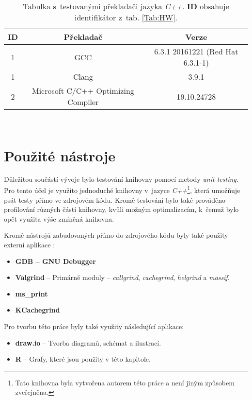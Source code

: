 \begin{table}[H]
	\begin{center}
		\begin{tabular}{| c | c | c |}
			\hline
			\textbf{ID} & \textbf{Překladač} & \textbf{Verze} \\
			\hline
			1 & GCC & 6.3.1 20161221 (Red Hat 6.3.1-1) \\
			\hline
			1 & Clang & 3.9.1 \\
			\hline
			2 & Microsoft C/C++ Optimizing Compiler & 19.10.24728 \\
			\hline
		\end{tabular}\\[1em]
		\caption{Tabulka s~testovanými překladači jazyka \emph{C++}. \textbf{ID} obsahuje identifikátor z~tab. \ref{Tab:HW}.}
		\label{Tab:Compiler}
	\end{center}
\end{table}

\section{Použité nástroje}

Důležitou součástí vývoje bylo testování knihovny pomocí metody \emph{unit testing}. Pro tento účel je využito jednoduché knihovny v~jazyce \emph{C++}\footnote{Tato knihovna byla vytvořena autorem této práce a není jiným způsobem zveřejněna.}, která umožňuje psát testy přímo ve zdrojovém kódu. Kromě testování bylo také prováděno profilování různých částí knihovny, kvůli možným optimalizacím, k~čemuž bylo opět využita výše zmíněná knihovna. 

Kromě nástrojů zabudovaných přímo do zdrojového kódu byly také použity externí aplikace : 
\begin{itemize}
	\item \textbf{GDB -- GNU Debugger}
	\item \textbf{Valgrind} -- Primárně moduly -- \emph{callgrind}, \emph{cachegrind}, \emph{helgrind} a \emph{massif}.
	\item \textbf{ms\_print}
	\item \textbf{KCachegrind}
\end{itemize}

\noindent Pro tvorbu této práce byly také využity následující aplikace:
\begin{itemize}
	\item \textbf{draw.io} -- Tvorba diagramů, schémat a ilustrací.
	\item \textbf{R} -- Grafy, které jsou použity v této kapitole.
\end{itemize}

